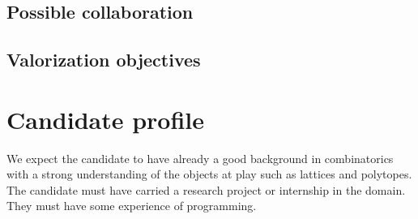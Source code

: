 \documentclass[a4paper,12pt]{article}
\begin{document}
\subsection{Possible collaboration}

\subsection{Valorization objectives}

\section{Candidate profile}

We expect the candidate to have already a good background in combinatorics with a strong understanding of the objects at play such as lattices and polytopes. The candidate must have carried a research project or internship in the domain. They must have some experience of programming.


\small
\renewcommand{\refname}{\normalsize Bibliography}

\normalsize
\end{document}
